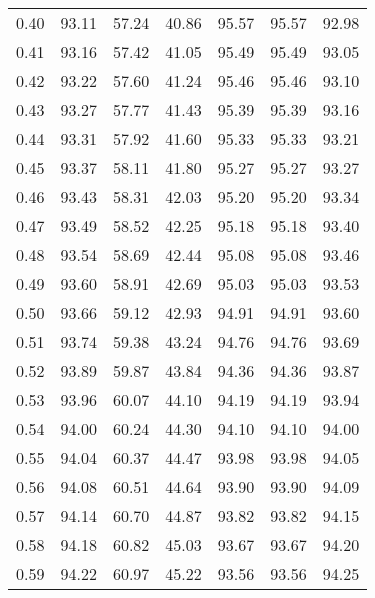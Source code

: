 \begin{tabular}{|c|c|c|c|c|c|c|}
      0.40 &     93.11 &     57.24 &      40.86 &   95.57 &      95.57 &         92.98 \\
      0.41 &     93.16 &     57.42 &      41.05 &   95.49 &      95.49 &         93.05 \\
      0.42 &     93.22 &     57.60 &      41.24 &   95.46 &      95.46 &         93.10 \\
      0.43 &     93.27 &     57.77 &      41.43 &   95.39 &      95.39 &         93.16 \\
      0.44 &     93.31 &     57.92 &      41.60 &   95.33 &      95.33 &         93.21 \\
      0.45 &     93.37 &     58.11 &      41.80 &   95.27 &      95.27 &         93.27 \\
      0.46 &     93.43 &     58.31 &      42.03 &   95.20 &      95.20 &         93.34 \\
      0.47 &     93.49 &     58.52 &      42.25 &   95.18 &      95.18 &         93.40 \\
      0.48 &     93.54 &     58.69 &      42.44 &   95.08 &      95.08 &         93.46 \\
      0.49 &     93.60 &     58.91 &      42.69 &   95.03 &      95.03 &         93.53 \\
      0.50 &     93.66 &     59.12 &      42.93 &   94.91 &      94.91 &         93.60 \\
      0.51 &     93.74 &     59.38 &      43.24 &   94.76 &      94.76 &         93.69 \\
      0.52 &     93.89 &     59.87 &      43.84 &   94.36 &      94.36 &         93.87 \\
      0.53 &     93.96 &     60.07 &      44.10 &   94.19 &      94.19 &         93.94 \\
      0.54 &     94.00 &     60.24 &      44.30 &   94.10 &      94.10 &         94.00 \\
      0.55 &     94.04 &     60.37 &      44.47 &   93.98 &      93.98 &         94.05 \\
      0.56 &     94.08 &     60.51 &      44.64 &   93.90 &      93.90 &         94.09 \\
      0.57 &     94.14 &     60.70 &      44.87 &   93.82 &      93.82 &         94.15 \\
      0.58 &     94.18 &     60.82 &      45.03 &   93.67 &      93.67 &         94.20 \\
      0.59 &     94.22 &     60.97 &      45.22 &   93.56 &      93.56 &         94.25 \\

\end{tabular}

